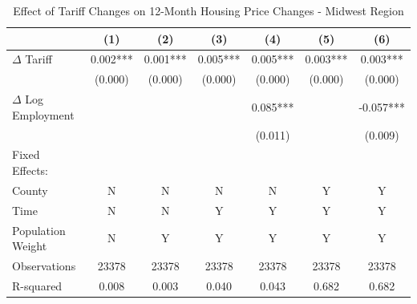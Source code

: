 \begin{table}[htbp]
\centering
\caption{Effect of Tariff Changes on 12-Month Housing Price Changes - Midwest Region}
\label{tab:tariffs_changes_midwest}
\begin{tabular}{lcccccc}
\toprule
{} &       (1) &      (2) &       (3) &       (4) &       (5) &        (6) \\
\midrule
$\Delta$ Tariff  &   0.002*** &    0.001*** &    0.005*** &    0.005*** &    0.003*** &    0.003*** \\
                 &    (0.000) &   (0.000) &   (0.000) &   (0.000) &   (0.000) &   (0.000) \\
$\Delta$ Log Employment  &           &           &           &  0.085*** &           &  -0.057*** \\
                  &           &           &           &   (0.011) &           &   (0.009) \\
Fixed Effects:    &           &           &           &           &           &           \\
County           &         N &        N &        N &        N &        Y &        Y \\
Time             &        N &         N &         Y &         Y &         Y &         Y \\
Population Weight &        N &         Y &         Y &         Y &         Y &         Y \\
\midrule
Observations     &     23378 &      23378 &      23378 &      23378 &      23378 &      23378 \\
R-squared        &     0.008 &     0.003 &     0.040 &     0.043 &     0.682 &     0.682 \\
\bottomrule
\end{tabular}
\end{table}
\FloatBarrier